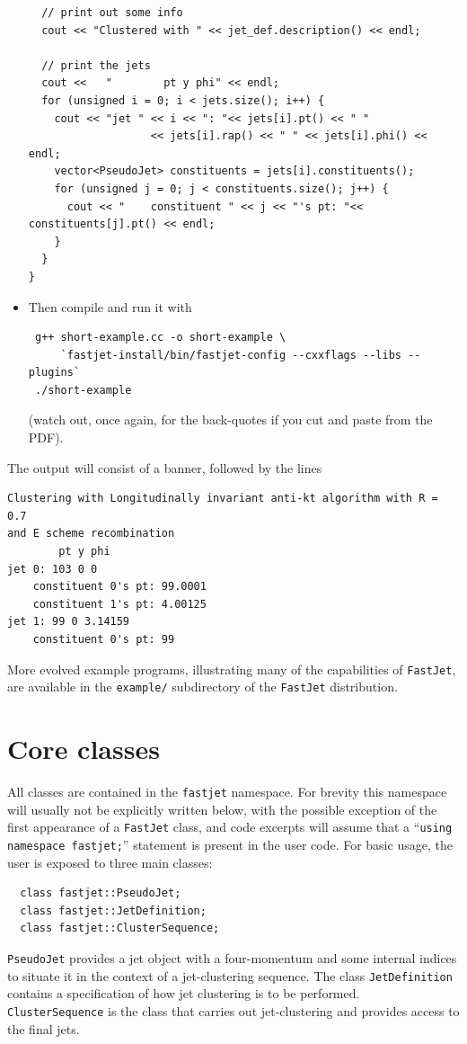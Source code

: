 \documentclass[12pt,a4]{article}
\newcommand{\fastjet}{\texttt{FastJet}\xspace}
\newcommand{\ttt}[1]{{\small\texttt{#1}}}
\begin{document}
\begin{itemize}
\begin{lstlisting}
  // print out some info
  cout << "Clustered with " << jet_def.description() << endl;

  // print the jets
  cout <<   "        pt y phi" << endl;
  for (unsigned i = 0; i < jets.size(); i++) {
    cout << "jet " << i << ": "<< jets[i].pt() << " " 
                   << jets[i].rap() << " " << jets[i].phi() << endl;
    vector<PseudoJet> constituents = jets[i].constituents();
    for (unsigned j = 0; j < constituents.size(); j++) {
      cout << "    constituent " << j << "'s pt: "<< constituents[j].pt() << endl;
    }
  }
}
\end{lstlisting}

\item \rm Then compile and run it with
\begin{verbatim}
 g++ short-example.cc -o short-example \
     `fastjet-install/bin/fastjet-config --cxxflags --libs --plugins`
 ./short-example
\end{verbatim}
(watch out, once again, for the back-quotes if you cut and paste from the PDF).
\end{itemize}
\noindent
The output will consist of a banner, followed by the lines
\begin{verbatim}
Clustering with Longitudinally invariant anti-kt algorithm with R = 0.7 
and E scheme recombination
        pt y phi
jet 0: 103 0 0
    constituent 0's pt: 99.0001
    constituent 1's pt: 4.00125
jet 1: 99 0 3.14159
    constituent 0's pt: 99
\end{verbatim}

More evolved example programs, illustrating many of the capabilities of \fastjet,
are available in the \ttt{example/} subdirectory of the
\fastjet distribution.

\section{Core classes}
\label{sec:core-classes}

All classes are contained in the \ttt{fastjet} namespace. For brevity this namespace
will usually not be explicitly written below, with the possible exception of the first
appearance of a \fastjet class, and code excerpts will
assume that a ``\ttt{using namespace fastjet;}'' statement is present in the user
code.
For basic
usage, the user is exposed to three main classes:
\begin{lstlisting}
  class fastjet::PseudoJet;
  class fastjet::JetDefinition;
  class fastjet::ClusterSequence;
\end{lstlisting}
\ttt{PseudoJet} provides a jet object with a four-momentum and some
internal indices to situate it in the context of a jet-clustering
sequence. 
%
The class \ttt{JetDefinition} contains a specification of how
jet clustering is to be performed. 
%
\ttt{ClusterSequence} is the class that carries out
jet-clustering and provides access to the final jets.
\end{document}
